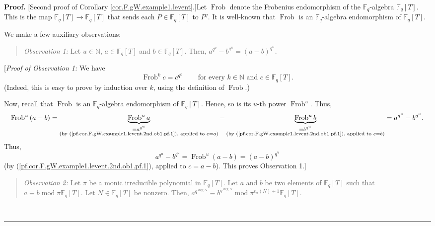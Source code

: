 \documentclass[numbers=enddot,12pt,final,onecolumn,notitlepage]{scrartcl}%
\theoremstyle{definition}
\newenvironment{statement}{\begin{quote}}{\end{quote}}
\newenvironment{proof}[1][Proof]{\noindent\textbf{#1.} }{\ \rule{0.5em}{0.5em}}
\begin{document}
\begin{proof}
[Second proof of Corollary \ref{cor.F.gW.example1.levent}.]Let
$\operatorname*{Frob}$ denote the Frobenius endomorphism of the $\mathbb{F}%
_{q}$-algebra $\mathbb{F}_{q}\left[  T\right]  $. This is the map
$\mathbb{F}_{q}\left[  T\right]  \rightarrow\mathbb{F}_{q}\left[  T\right]  $
that sends each $P\in\mathbb{F}_{q}\left[  T\right]  $ to $P^{q}$. It is
well-known that $\operatorname*{Frob}$ is an $\mathbb{F}_{q}$-algebra
endomorphism of $\mathbb{F}_{q}\left[  T\right]  $.

We make a few auxiliary observations:

\begin{statement}
\textit{Observation 1:} Let $u\in\mathbb{N}$, $a\in\mathbb{F}_{q}\left[
T\right]  $ and $b\in\mathbb{F}_{q}\left[  T\right]  $. Then, $a^{q^{u}%
}-b^{q^{u}}=\left(  a-b\right)  ^{q^{u}}$.
\end{statement}

[\textit{Proof of Observation 1:} We have%
\begin{equation}
\operatorname*{Frob}\nolimits^{k}c=c^{q^{k}}\ \ \ \ \ \ \ \ \ \ \text{for
every }k\in\mathbb{N}\text{ and }c\in\mathbb{F}_{q}\left[  T\right]  .
\label{pf.cor.F.gW.example1.levent.2nd.ob1.pf.1}%
\end{equation}
(Indeed, this is easy to prove by induction over $k$, using the definition of
$\operatorname*{Frob}$.)

Now, recall that $\operatorname*{Frob}$ is an $\mathbb{F}_{q}$-algebra
endomorphism of $\mathbb{F}_{q}\left[  T\right]  $. Hence, so is its $u$-th
power $\operatorname*{Frob}\nolimits^{u}$. Thus,%
\[
\operatorname*{Frob}\nolimits^{u}\left(  a-b\right)
=\underbrace{\operatorname*{Frob}\nolimits^{u}a}_{\substack{=a^{q^{u}%
}\\\text{(by (\ref{pf.cor.F.gW.example1.levent.2nd.ob1.pf.1}), applied to
}c=a\text{)}}}-\underbrace{\operatorname*{Frob}\nolimits^{u}b}%
_{\substack{=b^{q^{u}}\\\text{(by
(\ref{pf.cor.F.gW.example1.levent.2nd.ob1.pf.1}), applied to }c=b\text{)}%
}}=a^{q^{u}}-b^{q^{u}}.
\]
Thus,%
\[
a^{q^{u}}-b^{q^{u}}=\operatorname*{Frob}\nolimits^{u}\left(  a-b\right)
=\left(  a-b\right)  ^{q^{u}}%
\]
(by (\ref{pf.cor.F.gW.example1.levent.2nd.ob1.pf.1}), applied to $c=a-b$).
This proves Observation 1.]

\begin{statement}
\textit{Observation 2:} Let $\pi$ be a monic irreducible polynomial in
$\mathbb{F}_{q}\left[  T\right]  $. Let $a$ and $b$ be two elements of
$\mathbb{F}_{q}\left[  T\right]  $ such that $a\equiv b\operatorname{mod}%
\pi\mathbb{F}_{q}\left[  T\right]  $. Let $N\in\mathbb{F}_{q}\left[  T\right]
$ be nonzero. Then, $a^{q^{\deg N}}\equiv b^{q^{\deg N}}\operatorname{mod}%
\pi^{v_{\pi}\left(  N\right)  +1}\mathbb{F}_{q}\left[  T\right]  $.
\end{statement}


\end{proof}
\end{document}
